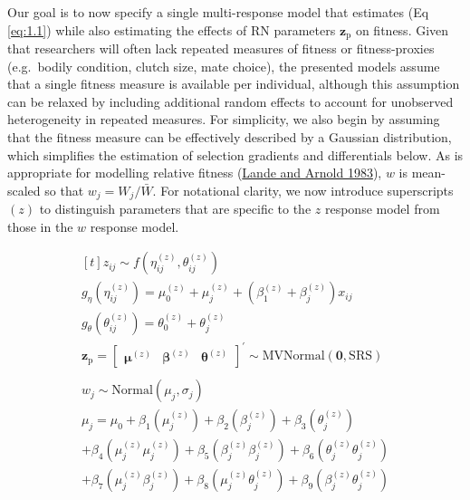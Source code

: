 \documentclass{article}
\begin{document}
Our goal is to now specify a single multi-response model that estimates
(Eq \ref{eq:1.1}) while also estimating the effects of RN parameters
\(\boldsymbol{z_{\mathrm{p}}}\) on fitness. Given that researchers will
often lack repeated measures of fitness or fitness-proxies (e.g.~bodily
condition, clutch size, mate choice), the presented models assume that a
single fitness measure is available per individual, although this
assumption can be relaxed by including additional random effects to
account for unobserved heterogeneity in repeated measures. For
simplicity, we also begin by assuming that the fitness measure can be
effectively described by a Gaussian distribution, which simplifies the
estimation of selection gradients and differentials below. As is
appropriate for modelling relative fitness
(\protect\hyperlink{ref-Lande1983}{Lande and Arnold 1983}), \(w\) is
mean-scaled so that \(w_j = W_j/\bar{W}\). For notational clarity, we
now introduce superscripts \((z)\) to distinguish parameters that are
specific to the \(z\) response model from those in the \(w\) response
model.

\begin{equation} \tag{1.2}\label{eq:1.2}
\begin{gathered}[t]
z_{ij} \sim f \left(\eta^{(z)}_{ij }, \theta^{(z)}_{ij} \right)  \\
g_\eta \left( \eta^{(z)}_{ij} \right) = \mu_0^{(z)} + \mu_j^{(z)}+ \left(\beta_1^{(z)} + \beta_j^{(z)} \right) x_{ij} \nonumber \\
g_\theta \left( \theta^{(z)}_{ij} \right) = \theta_0^{(z)} + \theta_{j}^{(z)} \nonumber \\
\boldsymbol{z_{\mathrm{p}}} = \begin{bmatrix}
\boldsymbol{\mu}^{(z)} &
\boldsymbol{\beta}^{(z)} &
\boldsymbol{\theta}^{(z)} \end{bmatrix} ^{\prime}
 \sim \mathrm{M}\mathrm{VNormal} \left(
\boldsymbol{0},\boldsymbol{\mathrm{S}}\boldsymbol{\mathrm{R}}\boldsymbol{\mathrm{S}} \right) \nonumber \\ 
\nonumber \\
w_{j} \sim \mathrm{Normal} \left( \mu_{j}, \sigma _{j} \right) \nonumber \\
\mu _{j} = \mu_0 + \beta_1 \left( \mu^{(z)}_{j} \right) + 
                \beta_2 \left( \beta_j^{(z)} \right) + 
                \beta_3 \left( \theta^{(z)}_{j} \right)  \nonumber  \\ 
                + \beta_4 \left( \mu^{(z)}_j \mu^{(z)}_j \right) +
                \beta_5\left( \beta^{(z)}_j \beta^{(z)}_j \right) +
                \beta_6 \left( \theta^{(z)}_j \theta^{(z)}_j \right)\\ 
                +  \beta_7 \left( \mu^{(z)}_j \beta^{(z)}_j \right) + 
                \beta_8 \left( \mu^{(z)}_j \theta^{(z)}_j \right) + 
                 \beta_9 \left( \beta^{(z)}_j \theta^{(z)}_j \right) \nonumber \\ 
\end{gathered}
\end{equation}
\end{document}
